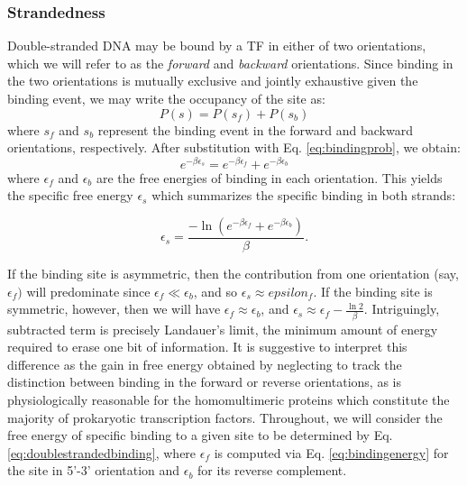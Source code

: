 \documentclass{article}
\begin{document}
\subsubsection{Strandedness}
Double-stranded DNA may be bound by a TF in either of two
orientations, which we will refer to as the \textit{forward} and
\textit{backward} orientations.  Since binding in the two orientations
is mutually exclusive and jointly exhaustive given the binding event,
we may write the occupancy of the site as:
\begin{equation}
P(s) = P(s_f) + P(s_b)
\end{equation}
where $s_f$ and $s_b$ represent the binding event in the forward and backward orientations, respectively.  After substitution with Eq. \ref{eq:bindingprob}, we obtain:
$$e^{-\beta \epsilon_s} = e^{-\beta \epsilon_f} + e^{-\beta \epsilon_b}$$
where $\epsilon_f$ and $\epsilon_b$ are the free energies of binding in
each orientation.  This yields the specific free energy
$\epsilon_s$ which summarizes the specific binding in both strands:

\begin{equation}
\label{eq:doublestrandedbinding}
\epsilon_s = \frac{-\ln(e^{-\beta \epsilon_f} + e^{-\beta \epsilon_b})}{\beta}.
\end{equation}

If the binding site is asymmetric, then the contribution from one
orientation (say, $\epsilon_f)$ will predominate since $\epsilon_f \ll
\epsilon_b$, and so $\epsilon_s \approx epsilon_f$.  If the binding
site is symmetric, however, then we will have $\epsilon_f \approx
\epsilon_b$, and $\epsilon_s \approx \epsilon_f - \frac{\ln
  2}{\beta}$.  Intriguingly, subtracted term is precisely Landauer's
limit, the minimum amount of energy required to erase one bit of
information.  \cite{landauer61} It is suggestive to interpret this
difference as the gain in free energy obtained by neglecting to track
the distinction between binding in the forward or reverse
orientations, as is physiologically reasonable for the homomultimeric
proteins which constitute the majority of prokaryotic transcription
factors.  Throughout, we will consider the free energy of specific
binding to a given site to be determined by
Eq. \ref{eq:doublestrandedbinding}, where $\epsilon_f$ is computed via
Eq. \ref{eq:bindingenergy} for the site in 5'-3' orientation and
$\epsilon_b$ for its reverse complement.
\end{document}
